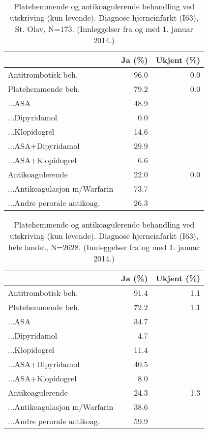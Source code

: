 \documentclass [norsk,a4paper,twoside]{article}\usepackage[]{graphicx}\usepackage[]{color}
\begin{document}
\begin{table}[ht]
\centering
\begin{tabular}{lrr}
  \hline
 & Ja (\%) & Ukjent (\%) \\ 
  \hline
Antitrombotisk beh. & 96.0 & 0.0 \\ 
  Platehemmende beh. & 79.2 & 0.0 \\ 
  ...ASA & 48.9 &  \\ 
  ...Dipyridamol & 0.0 &  \\ 
  ...Klopidogrel & 14.6 &  \\ 
  ...ASA+Dipyridamol & 29.9 &  \\ 
  ...ASA+Klopidogrel & 6.6 &  \\ 
  Antikoagulerende & 22.0 & 0.0 \\ 
  ...Antikoagulasjon m/Warfarin & 73.7 &  \\ 
  ...Andre perorale antikoag. & 26.3 &  \\ 
   \hline
\end{tabular}
\caption{Platehemmende og antikoagulerende behandling ved utskriving (kun levende). 
		Diagnose hjerneinfarkt (I63), St. Olav, N=173. (Innleggelser fra og med 1. januar 2014.)} 
\label{tab:MedBehPAUt1}
\end{table}
\begin{table}[ht]
\centering
\begin{tabular}{lrr}
  \hline
 & Ja (\%) & Ukjent (\%) \\ 
  \hline
Antitrombotisk beh. & 91.4 & 1.1 \\ 
  Platehemmende beh. & 72.2 & 1.1 \\ 
  ...ASA & 34.7 &  \\ 
  ...Dipyridamol & 4.7 &  \\ 
  ...Klopidogrel & 11.4 &  \\ 
  ...ASA+Dipyridamol & 40.5 &  \\ 
  ...ASA+Klopidogrel & 8.0 &  \\ 
  Antikoagulerende & 24.3 & 1.3 \\ 
  ...Antikoagulasjon m/Warfarin & 38.6 &  \\ 
  ...Andre perorale antikoag. & 59.9 &  \\ 
   \hline
\end{tabular}
\caption{Platehemmende og antikoagulerende behandling ved utskriving (kun levende). 
		Diagnose hjerneinfarkt (I63), hele landet, N=2628. (Innleggelser fra og med 1. januar 2014.)} 
\label{tab:MedBehPAUt2}
\end{table}
\end{document}

